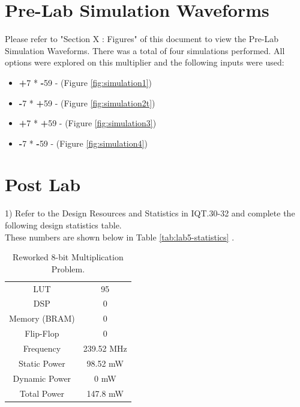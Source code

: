 \documentclass[journal, twocolumn, final,11pt,letterpaper]{IEEEtran}
\begin{document}
\section{Pre-Lab Simulation Waveforms}
Please refer to "Section X : Figures" of this document to view the Pre-Lab Simulation Waveforms. There was a total of four simulations performed. All options were explored on this multiplier and the following inputs were used: 
\begin{itemize}
	\item \textbf{+}7 * \textbf{-}59 - (Figure \ref{fig:simulation1})
	\item \textbf{-}7 * \textbf{+}59 - (Figure \ref{fig:simulation2t})
	\item \textbf{+}7 * \textbf{+}59 - (Figure \ref{fig:simulation3})
	\item \textbf{-}7 * \textbf{-}59  - (Figure \ref{fig:simulation4})
\end{itemize}
\section{Post Lab}
1)  Refer to the Design Resources and Statistics in IQT.30-32 and complete
the following design statistics table.\\

These numbers are shown below in Table \ref{tab:lab5-statistics} .

\begin{table}[htbp]
	\centering
	\caption{Reworked 8-bit Multiplication Problem. }
	\begin{tabular}{c|c}	%
		\toprule	%
		LUT & 95\\
		DSP & 0\\
		Memory (BRAM) & 0\\
		Flip-Flop & 0\\
		Frequency & 239.52 MHz\\
		Static Power & 98.52 mW\\
		Dynamic Power & 0 mW\\
		Total Power & 147.8 mW\\
	
		\bottomrule	%
	\end{tabular}%
	\label{tab:table2}	%
\end{table}%
\end{document}

